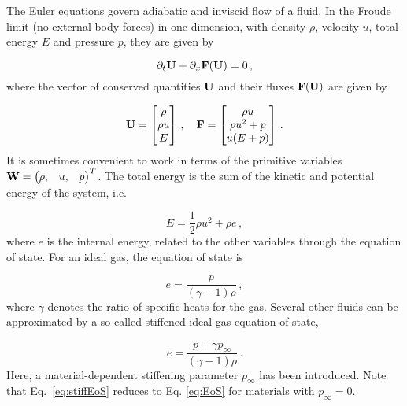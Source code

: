 \documentclass[final,3p,twocolumn]{elsarticle}
\begin{document}
The Euler equations govern adiabatic and inviscid flow of a fluid. In the
Froude limit (no external body forces) in one dimension, with density $\rho$,
velocity $u$, total energy $E$ and pressure $p$, they are given by 

\begin{equation}
    \partial_t {\bf U} + \partial_x {\bf F(U)} = 0\,,
    \label{eq:euler}
\end{equation}
%
where the vector of conserved quantities ${\bf U}$ and their fluxes ${\bf F(U)}$ are given by

\begin{equation*}
    {\bf U} = 
    \begin{bmatrix} 
        \rho \\ 
        \rho u \\ 
        E 
    \end{bmatrix}
    \,,\quad
    {\bf F} = 
    \begin{bmatrix}
        \rho u \\ 
        \rho u^2 + p \\
        u(E+p) 
    \end{bmatrix}
    \,.
\end{equation*}
%
It is sometimes convenient to work in terms of the primitive variables ${\bf W} =
\begin{pmatrix} \rho, & u, & p \end{pmatrix}^T$. The total energy is the sum of
the kinetic and potential energy of the system, i.e.~ 

\begin{equation}
    E = \frac{1}{2} \rho u^2 + \rho e \,,
    \label{eq:energy}
\end{equation}
%
where $e$ is the internal energy, related to the other variables through the
equation of state. For an ideal gas, the equation of state is 

\begin{equation}
     e = \frac{p}{(\gamma-1)\rho} \,,
     \label{eq:EoS}
 \end{equation}
%
where $\gamma$ denotes the ratio of specific heats for the gas. Several other
fluids can be approximated by a so-called stiffened ideal gas equation of
state, 

\begin{equation}
    e = \frac{p+\gamma p_{\infty}}{(\gamma-1)\rho} \,.
    \label{eq:stiffEoS}
\end{equation}
%
Here, a material-dependent stiffening parameter $p_{\infty}$ has been
introduced. Note that Eq.\ \eqref{eq:stiffEoS} reduces to Eq. \eqref{eq:EoS} for
materials with $p_{\infty}=0$.
\end{document}
